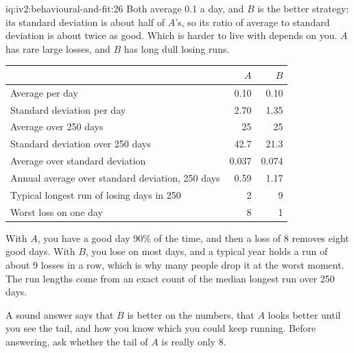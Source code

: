 \begin{solution}{iq:iv2:behavioural-and-fit:26}
Both average 0.1 a day, and $B$ is the better strategy: its standard deviation is about half of $A$'s, so its ratio of average to standard deviation is about twice as good. Which is harder to live with depends on you. $A$ has rare large losses, and $B$ has long dull losing runs.

\begin{center}\small
\begin{tabular}{@{}lrr@{}}
 & $A$ & $B$ \\ \hline
Average per day & 0.10 & 0.10 \\
Standard deviation per day & 2.70 & 1.35 \\
Average over 250 days & 25 & 25 \\
Standard deviation over 250 days & 42.7 & 21.3 \\
Average over standard deviation & 0.037 & 0.074 \\
Annual average over standard deviation, 250 days & 0.59 & 1.17 \\
Typical longest run of losing days in 250 & 2 & 9 \\
Worst loss on one day & 8 & 1
\end{tabular}
\end{center}
With $A$, you have a good day 90\% of the time, and then a loss of 8 removes eight good days. With $B$, you lose on most days, and a typical year holds a run of about 9 losses in a row, which is why many people drop it at the worst moment. The run lengths come from an exact count of the median longest run over 250 days.

A sound answer says that $B$ is better on the numbers, that $A$ looks better until you see the tail, and how you know which you could keep running. Before answering, ask whether the tail of $A$ is really only 8.

\end{solution}


